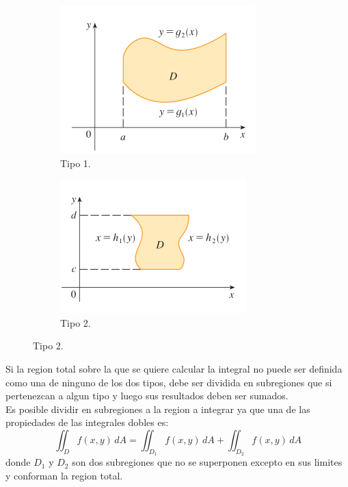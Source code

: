 \documentclass[12pt]{article}
\begin{document}
\begin{figure}[h!]
    \centering
    \begin{subfigure}{0.4\linewidth}
        \includegraphics[width=\linewidth]{tipo1.png}
        \caption{Tipo 1.}
        \end{subfigure}
    \begin{subfigure}{0.4\linewidth}
        \includegraphics[width=\linewidth]{tipo2.png}
        \caption{Tipo 2.}
        \end{subfigure}
        \end{figure}
        
Si la region total sobre la que se quiere calcular la integral no puede ser definida como
una de ninguno de los dos tipos, debe ser dividida en subregiones que si pertenezcan a algun
tipo y luego sus resultados deben ser sumados.\\
Es posible dividir en subregiones a la region a integrar ya que una de las propiedades de las
integrales dobles es:
$$\iint_D f(x,y)\,dA = \iint_{D_1} f(x,y)\,dA + \iint_{D_2} f(x,y)\,dA$$
donde $D_1$ y $D_2$ son dos subregiones que no se superponen excepto en sus limites y conforman
la region total.
\end{document}
